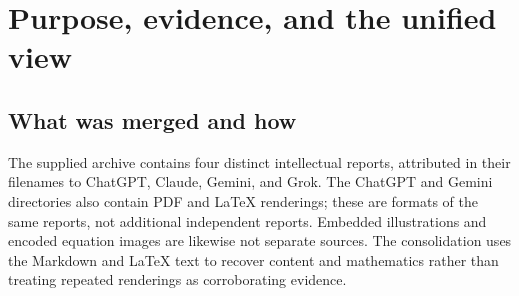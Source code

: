\documentclass[11pt,letterpaper]{article}
\numberwithin{equation}{section}
\theoremstyle{definition}
\theoremstyle{remark}
\begin{document}
\begin{abstract}
Radical denesting asks whether an algebraic expression can be represented with fewer layers of root extraction. Its literature runs from classical binomial surds and Ramanujan's identities to Galois-theoretic decision procedures, algorithms for restricted real radical extensions, and practical simplifiers in computer-algebra systems. This report merges four supplied research reports, removes repeated descriptions and duplicate publication records, corrects mathematical and bibliographic errors, and supplies a structured guide to the resulting literature.

The central distinction is between \emph{existence}, \emph{construction}, \emph{minimum depth}, \emph{algebraic equality}, and \emph{efficient implementation}. Precise proofs are given for direct quadratic denesting, a restricted cubic-in-quadratic criterion, several benchmark identities, and the classical convergence criterion for infinite square-root nests. The more general results of Borodin--Fagin--Hopcroft--Tompa, Zippel, Landau, Bl\"omer, Horng--Huang, Cotner, and Honsbeek are placed in their appropriate field and complexity models. Later work through 2026 and the documented capabilities of SymPy, Maxima, Wolfram Language, Maple, SageMath, and PARI/GP are assessed without treating heuristics as completeness theorems. An annotated bibliography, reading paths, reproducible checks, and a correction ledger make the survey useful both as a research starting point and as an implementation reference.
\end{abstract}
\tableofcontents
\clearpage

\section{Purpose, evidence, and the unified view}\label{sec:scope}

\subsection{What was merged and how}
The supplied archive contains four distinct intellectual reports, attributed in their filenames to ChatGPT, Claude, Gemini, and Grok. The ChatGPT and Gemini directories also contain PDF and LaTeX renderings; these are formats of the same reports, not additional independent reports. Embedded illustrations and encoded equation images are likewise not separate sources. The consolidation uses the Markdown and LaTeX text to recover content and mathematics rather than treating repeated renderings as corroborating evidence.
\end{document}

